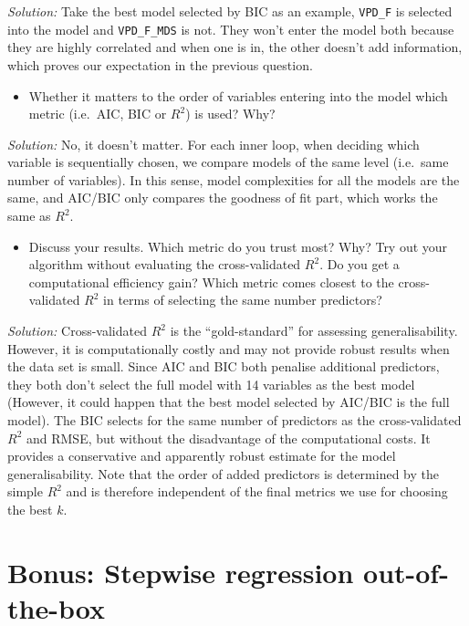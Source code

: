 \documentclass[
]{book}
\providecommand{\tightlist}{%
  \setlength{\itemsep}{0pt}\setlength{\parskip}{0pt}}
\begin{document}
\emph{Solution:}
Take the best model selected by BIC as an example, \texttt{VPD\_F} is selected into the model and \texttt{VPD\_F\_MDS} is not. They won't enter the model both because they are highly correlated and when one is in, the other doesn't add information, which proves our expectation in the previous question.

\begin{itemize}
\tightlist
\item
  Whether it matters to the order of variables entering into the model which metric (i.e.~AIC, BIC or \(R^2\)) is used? Why?
\end{itemize}

\emph{Solution:}
No, it doesn't matter. For each inner loop, when deciding which variable is sequentially chosen, we compare models of the same level (i.e.~same number of variables). In this sense, model complexities for all the models are the same, and AIC/BIC only compares the goodness of fit part, which works the same as \(R^2\).

\begin{itemize}
\tightlist
\item
  Discuss your results. Which metric do you trust most? Why? Try out your algorithm without evaluating the cross-validated \(R^2\). Do you get a computational efficiency gain? Which metric comes closest to the cross-validated \(R^2\) in terms of selecting the same number predictors?
\end{itemize}

\emph{Solution:}
Cross-validated \(R^2\) is the ``gold-standard'' for assessing generalisability. However, it is computationally costly and may not provide robust results when the data set is small. Since AIC and BIC both penalise additional predictors, they both don't select the full model with 14 variables as the best model (However, it could happen that the best model selected by AIC/BIC is the full model). The BIC selects for the same number of predictors as the cross-validated \(R^2\) and RMSE, but without the disadvantage of the computational costs. It provides a conservative and apparently robust estimate for the model generalisability. Note that the order of added predictors is determined by the simple \(R^2\) and is therefore independent of the final metrics we use for choosing the best \(k\).

\hypertarget{bonus-stepwise-regression-out-of-the-box}{%
\section{Bonus: Stepwise regression out-of-the-box}\label{bonus-stepwise-regression-out-of-the-box}}
\end{document}
